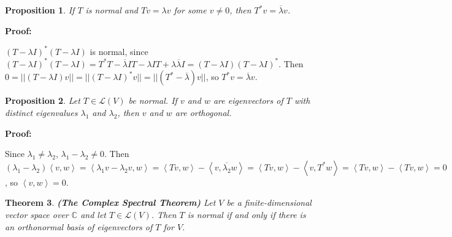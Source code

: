 \documentclass{article}
\theoremstyle{colontheorem}
\newtheorem{theorem}{Theorem}[section]
\newtheorem{proposition}[theorem]{Proposition}
\newenvironment{Theorem}
{
	\begin{mdframed}[backgroundcolor=TheoremOrange!10]
	\begin{theorem}
}
{
	\end{theorem}
	\end{mdframed}
	
	\vspace{.15in}
}
\newenvironment{Proposition}
{
	\begin{mdframed}[backgroundcolor=TheoremOrange!10]
	\begin{proposition}
}
{
	\end{proposition}
	\end{mdframed}
	
	\vspace{.15in}
}
\newenvironment{Proof}
{
	\vspace{-.3in}
	
	\begin{mdframed}[backgroundcolor=ProofPurple!10]
	\textbf{Proof:}%
}
{
	\end{mdframed}
	
	\vspace{.15in}
}
\begin{document}
\begin{Proposition}
	
	If $T$ is normal and $Tv = \lambda v$ for some $v \neq 0$, then $T^* v = \overline{\lambda} v$.
	
\end{Proposition}



\begin{Proof}
	$(T- \lambda I)^* (T - \lambda I)$ is normal, since $(T- \lambda I)^* (T - \lambda I) = T^* T - \overline{\lambda} IT - \lambda IT + \lambda \overline{\lambda} I = (T- \lambda I)(T - \lambda I)^*$. Then $0 = ||(T - \lambda I)v|| = ||(T - \lambda I)^* v|| = ||(T^* - \overline{\lambda})v||$, so $T^* v = \overline{\lambda} v$.
	
\end{Proof}



\begin{Proposition}
	
	Let $T \in \mathcal{L}(V)$ be normal. If $v$ and $w$ are eigenvectors of $T$ with distinct eigenvalues $\lambda_1$ and $\lambda_2$, then $v$ and $w$ are orthogonal.
	
\end{Proposition}



\begin{Proof}
	Since $\lambda_1 \neq \lambda_2$, $\lambda_1 - \lambda_2 \neq 0$. Then $(\lambda_1 - \lambda_2) \left< v, w \right> = \left< \lambda_1 v - \lambda_2 v, w \right> = \left< Tv, w \right> - \left< v, \overline{\lambda_2} w \right> = \left< Tv, w \right> - \left< v, T^* w \right> = \left< Tv, w \right> - \left< Tv, w \right> = 0$, so $\left< v, w \right> = 0$.
	
\end{Proof}



\begin{Theorem}
	
	\textbf{(The Complex Spectral Theorem)} Let $V$ be a finite-dimensional vector space over $\mathbb{C}$ and let $T \in \mathcal{L}(V)$. Then $T$ is normal if and only if there is an orthonormal basis of eigenvectors of $T$ for $V$.
	
\end{Theorem}
\end{document}
